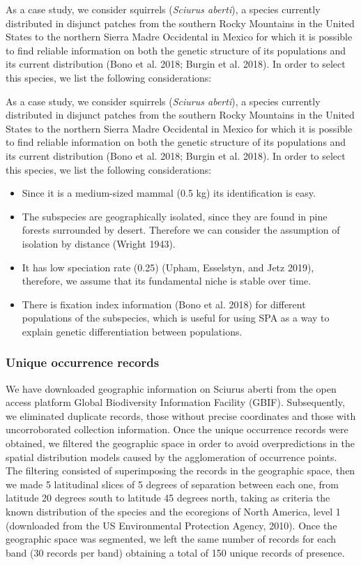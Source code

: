 \documentclass[
]{article}
\providecommand{\tightlist}{%
  \setlength{\itemsep}{0pt}\setlength{\parskip}{0pt}}
\begin{document}
As a case study, we consider squirrels (\emph{Sciurus aberti}), a species
currently distributed in disjunct patches from the southern Rocky
Mountains in the United States to the northern Sierra Madre Occidental
in Mexico for which it is possible to find reliable information on both
the genetic structure of its populations and its current distribution
(Bono et al. 2018; Burgin et al. 2018). In order to select this species,
we list the following considerations:

As a case study, we consider squirrels (\emph{Sciurus aberti}), a
species currently distributed in disjunct patches from the southern
Rocky Mountains in the United States to the northern Sierra Madre
Occidental in Mexico for which it is possible to find reliable
information on both the genetic structure of its populations and its
current distribution (Bono et al. 2018; Burgin et al. 2018). In order to
select this species, we list the following considerations:

\begin{itemize}
\tightlist
\item
  Since it is a medium-sized mammal (0.5 kg) its identification is easy.
\item
  The subspecies are geographically isolated, since they are found in
  pine forests surrounded by desert. Therefore we can consider the
  assumption of isolation by distance (Wright 1943).
\item
  It has low speciation rate (0.25) (Upham, Esselstyn, and Jetz 2019),
  therefore, we assume that its fundamental niche is stable over time.
\item
  There is fixation index information (Bono et al. 2018) for different
  populations of the subspecies, which is useful for using SPA as a way
  to explain genetic differentiation between populations.
\end{itemize}

\hypertarget{unique-occurrence-records}{%
\subsubsection{Unique occurrence
records}\label{unique-occurrence-records}}

We have downloaded geographic information on Sciurus aberti from the
open access platform Global Biodiversity Information Facility (GBIF).
Subsequently, we eliminated duplicate records, those without precise
coordinates and those with uncorroborated collection information. Once
the unique occurrence records were obtained, we filtered the geographic
space in order to avoid overpredictions in the spatial distribution
models caused by the agglomeration of occurrence points. The filtering
consisted of superimposing the records in the geographic space, then we
made 5 latitudinal slices of 5 degrees of separation between each one,
from latitude 20 degrees south to latitude 45 degrees north, taking as
criteria the known distribution of the species and the ecoregions of
North America, level 1 (downloaded from the US Environmental Protection
Agency, 2010). Once the geographic space was segmented, we left the same
number of records for each band (30 records per band) obtaining a total
of 150 unique records of presence.
\end{document}
